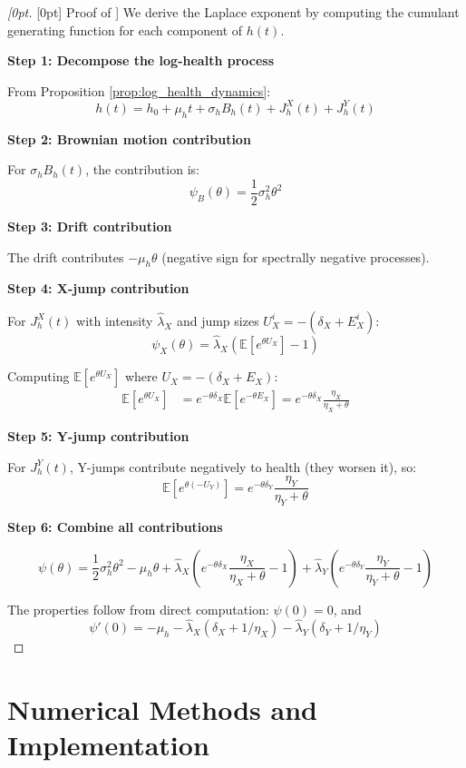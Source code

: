 \documentclass{article}
\theoremstyle{definition}
\newenvironment{delayedproof}[1]
 {\begin{proof}[\raisedtarget{#1}Proof of \Cref{#1}]}
 {\end{proof}}
\newcommand{\raisedtarget}[1]{%
  \raisebox{\fontcharht\font`P}[0pt][0pt]{\hypertarget{#1}{}}%
}
\begin{document}
\begin{delayedproof}{prop:laplace_exponent}
We derive the Laplace exponent by computing the cumulant generating function for each component of $h(t)$.

\textbf{Step 1: Decompose the log-health process}

From Proposition \ref{prop:log_health_dynamics}:
\[
h(t) = h_0 + \mu_h t + \sigma_h B_h(t) + J_h^X(t) + J_h^Y(t)
\]

\textbf{Step 2: Brownian motion contribution}

For $\sigma_h B_h(t)$, the contribution is:
\[
\psi_B(\theta) = \frac{1}{2}\sigma_h^2 \theta^2
\]

\textbf{Step 3: Drift contribution}

The drift contributes $-\mu_h \theta$ (negative sign for spectrally negative processes).

\textbf{Step 4: X-jump contribution}

For $J_h^X(t)$ with intensity $\hat\lambda_X$ and jump sizes $U_X^i = -(\delta_X + E_X^i)$:
\[
\psi_X(\theta) = \hat\lambda_X (\mathbb{E}[e^{\theta U_X}] - 1)
\]

Computing $\mathbb{E}[e^{\theta U_X}]$ where $U_X = -(\delta_X + E_X)$:
\begin{align}
\mathbb{E}[e^{\theta U_X}] &= e^{-\theta \delta_X} \mathbb{E}[e^{-\theta E_X}] = e^{-\theta \delta_X} \frac{\eta_X}{\eta_X + \theta}
\end{align}

\textbf{Step 5: Y-jump contribution}

For $J_h^Y(t)$, Y-jumps contribute negatively to health (they worsen it), so:
\[
\mathbb{E}[e^{\theta(-U_Y)}] = e^{-\theta \delta_Y} \frac{\eta_Y}{\eta_Y + \theta}
\]

\textbf{Step 6: Combine all contributions}

\[
\psi(\theta) = \frac{1}{2}\sigma_h^2 \theta^2 - \mu_h \theta + \hat\lambda_X \left( e^{-\theta \delta_X} \frac{\eta_X}{\eta_X+\theta} - 1 \right) + \hat\lambda_Y \left( e^{-\theta \delta_Y} \frac{\eta_Y}{\eta_Y+\theta} - 1 \right)
\]

The properties follow from direct computation: $\psi(0) = 0$, and 
\[
\psi'(0) = -\mu_h - \hat\lambda_X(\delta_X + 1/\eta_X) - \hat\lambda_Y(\delta_Y + 1/\eta_Y)
\]
\end{delayedproof}

\section{Numerical Methods and Implementation}
\label{sec:numerical_methods}
\end{document}
